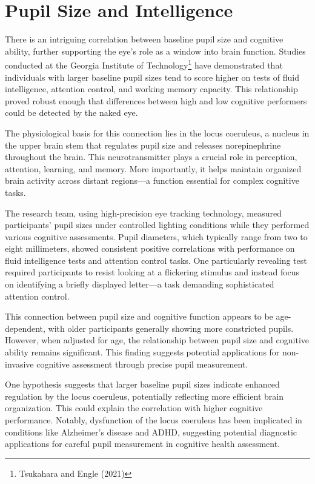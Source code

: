 \documentclass[
  Letterpaper,
]{scrbook}
\begin{document}
\section{Pupil Size and Intelligence}\label{pupil-size-and-intelligence}

There is an intriguing correlation between baseline pupil size and
cognitive ability, further supporting the eye's role as a window into
brain function. Studies conducted at the Georgia Institute of
Technology\footnote{Tsukahara and Engle (2021)} have demonstrated that
individuals with larger baseline pupil sizes tend to score higher on
tests of fluid intelligence, attention control, and working memory
capacity. This relationship proved robust enough that differences
between high and low cognitive performers could be detected by the naked
eye.

The physiological basis for this connection lies in the locus coeruleus,
a nucleus in the upper brain stem that regulates pupil size and releases
norepinephrine throughout the brain. This neurotransmitter plays a
crucial role in perception, attention, learning, and memory. More
importantly, it helps maintain organized brain activity across distant
regions---a function essential for complex cognitive tasks.

The research team, using high-precision eye tracking technology,
measured participants' pupil sizes under controlled lighting conditions
while they performed various cognitive assessments. Pupil diameters,
which typically range from two to eight millimeters, showed consistent
positive correlations with performance on fluid intelligence tests and
attention control tasks. One particularly revealing test required
participants to resist looking at a flickering stimulus and instead
focus on identifying a briefly displayed letter---a task demanding
sophisticated attention control.

This connection between pupil size and cognitive function appears to be
age-dependent, with older participants generally showing more
constricted pupils. However, when adjusted for age, the relationship
between pupil size and cognitive ability remains significant. This
finding suggests potential applications for non-invasive cognitive
assessment through precise pupil measurement.

One hypothesis suggests that larger baseline pupil sizes indicate
enhanced regulation by the locus coeruleus, potentially reflecting more
efficient brain organization. This could explain the correlation with
higher cognitive performance. Notably, dysfunction of the locus
coeruleus has been implicated in conditions like Alzheimer's disease and
ADHD, suggesting potential diagnostic applications for careful pupil
measurement in cognitive health assessment.
\end{document}

